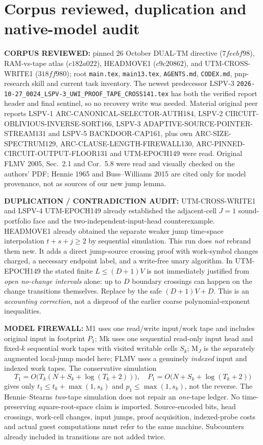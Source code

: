 \documentclass[11pt]{article}
\begin{document}
\section{Corpus reviewed, duplication and native-model audit}
\textbf{CORPUS REVIEWED:} pinned 26 October DUAL-TM directive
($7feebf98$), RAM-vs-tape atlas ($c182a022$), HEADMOVE1
($c9c20862$), and UTM-CROSS-WRITE1 ($318ff980$);
root \texttt{main.tex}, \texttt{main13.tex}, \texttt{AGENTS.md},
\texttt{CODEX.md}, pnp-research skill and current task inventory.
The newest predecessor LSPV-3
\texttt{2026-10-27\_0024\_LSPV-3\_UWI\_PROOF\_TAPE\_CROSS141.tex}
has both the verified report header and final sentinel, so no
recovery write was needed. Material original peer reports LSPV-1
ARC-CANONICAL-SELECTOR-AUTH184, LSPV-2 CIRCUIT-OBLIVIOUS-INVERSE-SORT166,
LSPV-3 ADAPTIVE-SOURCE-POINTER-STREAM131 and LSPV-5 BACKDOOR-CAP161,
plus own ARC-SIZE-SPECTRUM129, ARC-CLAUSE-LENGTH-FIREWALL130,
ARC-PINNED-CIRCUIT-OUTPUT-FLOOR131 and UTM-EPOCH149 were read.
Original FLMV 2005, Sec.~2.1 and Cor.~5.8 were read and
visually checked on the authors' PDF; Hennie 1965 and
Buss--Williams 2015 are cited only for model provenance,
not as sources of our new jump lemma.

\textbf{DUPLICATION / CONTRADICTION AUDIT:}
UTM-CROSS-WRITE1 and LSPV-4 UTM-EPOCH149 already established
the adjacent-cell $J=1$ sound-portfolio face and the two-independent-input-head
counterexample. HEADMOVE1 already obtained the separate weaker jump
time-space interpolation $t+s+j\ge2$ by sequential simulation.
This run does \emph{not} rebrand them new. It adds a
direct jump-source crossing proof with work-symbol changes charged,
a necessary endpoint label, and a write-free unary algorithm.
In UTM-EPOCH149 the stated finite $L\le(D+1)V$ is not
immediately justified from \emph{open no-change intervals} alone:
up to $D$ boundary crossings can happen on the change transitions
themselves. Replace by the safe $(D+1)V+D$. This is an
\emph{accounting correction}, not a disproof of the earlier
coarse polynomial-exponent inequalities.

\textbf{MODEL FIREWALL:}
M1 uses one read/write input/work tape and includes original input in
footprint $P_1$; Mk uses one sequential read-only input head and fixed-$k$
sequential work tapes with visited writable cells $S_k$;
M$_J$ is the separately augmented local-jump model here;
FLMV uses a genuinely \emph{indexed} input and indexed work tapes.
The conservative simulation
\[
 T_1=O\bigl(T_k(N+S_k+\log(T_k+2))\bigr),\quad
 P_1=O\bigl(N+S_k+\log(T_k+2)\bigr)
\]
gives only $t_1\le t_k+\max(1,s_k)$ and
$p_1\le\max(1,s_k)$, not the reverse. The
Hennie--Stearns \emph{two}-tape simulation does not repair
an \emph{one}-tape ledger. No time-preserving square-root-space
claim is imported.
Source-encoded bits, head crossings, work-cell changes,
input jumps, proof acquisition, indexed-probe costs and actual
guest computations must refer to the same machine.
Subcounters already included in transitions are not added twice.
\end{document}
